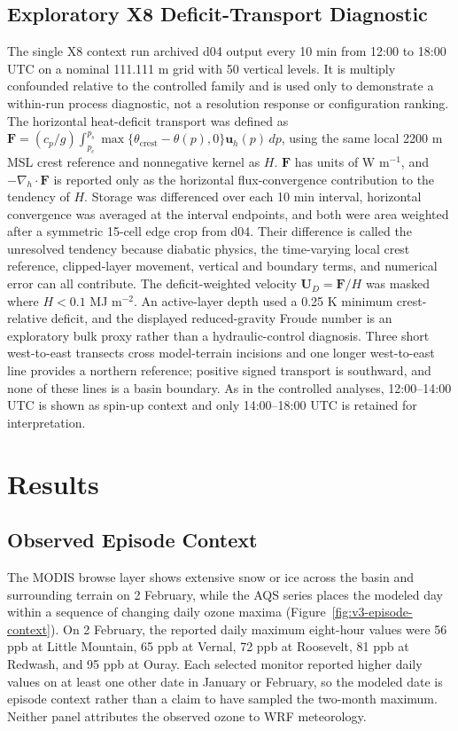 \documentclass[air,article,submit,moreauthors]{Definitions/mdpi}
\begin{document}
\subsection{Exploratory X8 Deficit-Transport Diagnostic}
\label{sec:v3-x8-methods}

The single X8 context run archived d04 output every 10 min from 12:00 to 18:00 UTC on a nominal 111.111 m grid with 50 vertical levels.
It is multiply confounded relative to the controlled family and is used only to demonstrate a within-run process diagnostic, not a resolution response or configuration ranking.
The horizontal heat-deficit transport was defined as $\mathbf{F}=(c_{p}/g)\int_{p_{c}}^{p_{s}}\max\{\theta_{\mathrm{crest}}-\theta(p),0\}\mathbf{u}_{h}(p)\,dp$, using the same local 2200 m MSL crest reference and nonnegative kernel as $H$.
$\mathbf{F}$ has units of W m$^{-1}$, and $-\nabla_{h}\!\cdot\mathbf{F}$ is reported only as the horizontal flux-convergence contribution to the tendency of $H$.
Storage was differenced over each 10 min interval, horizontal convergence was averaged at the interval endpoints, and both were area weighted after a symmetric 15-cell edge crop from d04.
Their difference is called the unresolved tendency because diabatic physics, the time-varying local crest reference, clipped-layer movement, vertical and boundary terms, and numerical error can all contribute.
The deficit-weighted velocity $\mathbf{U}_{D}=\mathbf{F}/H$ was masked where $H<0.1$ MJ m$^{-2}$.
An active-layer depth used a 0.25 K minimum crest-relative deficit, and the displayed reduced-gravity Froude number is an exploratory bulk proxy rather than a hydraulic-control diagnosis.
Three short west-to-east transects cross model-terrain incisions and one longer west-to-east line provides a northern reference; positive signed transport is southward, and none of these lines is a basin boundary.
As in the controlled analyses, 12:00--14:00 UTC is shown as spin-up context and only 14:00--18:00 UTC is retained for interpretation.

\section{Results}

\subsection{Observed Episode Context}

The MODIS browse layer shows extensive snow or ice across the basin and surrounding terrain on 2 February, while the AQS series places the modeled day within a sequence of changing daily ozone maxima (Figure~\ref{fig:v3-episode-context}).
On 2 February, the reported daily maximum eight-hour values were 56 ppb at Little Mountain, 65 ppb at Vernal, 72 ppb at Roosevelt, 81 ppb at Redwash, and 95 ppb at Ouray.
Each selected monitor reported higher daily values on at least one other date in January or February, so the modeled date is episode context rather than a claim to have sampled the two-month maximum.
Neither panel attributes the observed ozone to WRF meteorology.
\end{document}
